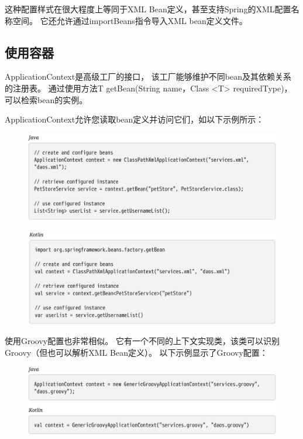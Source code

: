 \newpage
这种配置样式在很大程度上等同于XML Bean定义，甚至支持Spring的XML配置名称空间。 
它还允许通过importBeans指令导入XML bean定义文件。

\subsection{使用容器}

ApplicationContext是高级工厂的接口，
该工厂能够维护不同bean及其依赖关系的注册表。 
通过使用方法T getBean(String name，Class <T> requiredType)，可以检索bean的实例。

ApplicationContext允许您读取bean定义并访问它们，如以下示例所示：

\begin{figure}[ht]
    \centering
    \includegraphics[width=1\linewidth]{./Figure/IMG_code_7.png}
\end{figure}

\newpage
\begin{figure}[ht]
    \centering
    \includegraphics[width=1\linewidth]{./Figure/IMG_code_8.png}
\end{figure}

使用Groovy配置也非常相似。 
它有一个不同的上下文实现类，该类可以识别Groovy（但也可以解析XML Bean定义）。
 以下示例显示了Groovy配置：

 \begin{figure}[ht]
    \centering
    \includegraphics[width=1\linewidth]{./Figure/IMG_code_9.png}
\end{figure}

